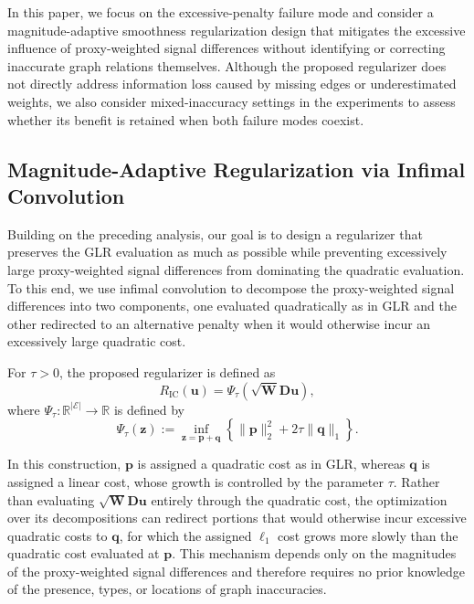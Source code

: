 In this paper, we focus on the excessive-penalty failure mode and consider a magnitude-adaptive smoothness regularization design that mitigates the excessive influence of proxy-weighted signal differences without identifying or correcting inaccurate graph relations themselves.
Although the proposed regularizer does not directly address information loss caused by missing edges or underestimated weights, we also consider mixed-inaccuracy settings in the experiments to assess whether its benefit is retained when both failure modes coexist.


\subsection{Magnitude-Adaptive Regularization via Infimal Convolution}
\label{subsec:magnitude-adaptive}

Building on the preceding analysis, our goal is to design a regularizer that preserves the GLR evaluation as much as possible while preventing excessively large proxy-weighted signal differences from dominating the quadratic evaluation.
To this end, we use infimal convolution to decompose the proxy-weighted signal differences into two components, one evaluated quadratically as in GLR and the other redirected to an alternative penalty when it would otherwise incur an excessively large quadratic cost.

\begin{definition}
\label{def:proposed-regularizer}
For $\tau>0$, the proposed regularizer is defined as
\begin{equation}
R_{\mathrm{IC}}(\mathbf{u})
=
\Psi_{\tau}
\left(
\sqrt{\mathbf{W}}\mathbf{D}\mathbf{u}
\right),
\label{eq:proposed-regularizer}
\end{equation}
where $\Psi_{\tau}:\mathbb{R}^{|\mathcal{E}|}\rightarrow\mathbb{R}$ is defined by
\begin{equation}
\Psi_{\tau}(\mathbf{z})
:=
\inf_{\mathbf{z}=\mathbf{p}+\mathbf{q}}
\left\{
\|\mathbf{p}\|_2^2
+
2\tau\|\mathbf{q}\|_1
\right\}.
\label{eq:edge-domain-penalty}
\end{equation}
\end{definition}

In this construction, $\mathbf{p}$ is assigned a quadratic cost as in GLR, whereas $\mathbf{q}$ is assigned a linear cost, whose growth is controlled by the parameter $\tau$.
Rather than evaluating $\sqrt{\mathbf{W}}\mathbf{D}\mathbf{u}$ entirely through the quadratic cost, the optimization over its decompositions can redirect portions that would otherwise incur excessive quadratic costs to $\mathbf{q}$, for which the assigned $\ell_1$ cost grows more slowly than the quadratic cost evaluated at $\mathbf{p}$.
This mechanism depends only on the magnitudes of the proxy-weighted signal differences and therefore requires no prior knowledge of the presence, types, or locations of graph inaccuracies.

